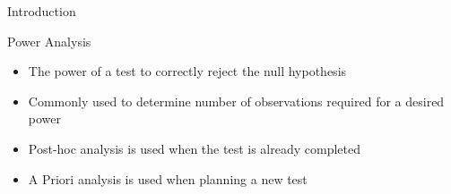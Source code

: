 \begin{frame}{Introduction}
			\begin{block}{Power Analysis}
				\begin{itemize}
					\item The power of a test to correctly reject the null hypothesis
					\item Commonly used to determine number of observations required for a desired power
					\item Post-hoc analysis is used when the test is already completed
					\item A Priori analysis is used when planning a new test
				\end{itemize}
			\end{block}

			
		\end{frame}